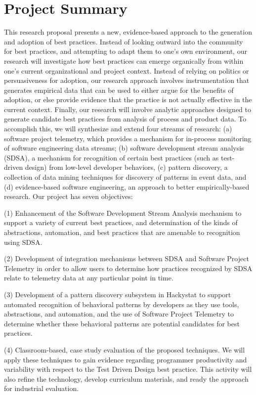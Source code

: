 \documentclass[11pt]{article}
\begin{document}
\section*{Project Summary}

This research proposal presents a new, evidence-based approach to the
generation and adoption of best practices.  Instead of looking outward into
the community for best practices, and attempting to adapt them to one's own
environment, our research will investigate how best practices can emerge
organically from within one's current organizational and project context.
Instead of relying on politics or persuasiveness for adoption, our research
approach involves instrumentation that generates empirical data that can be
used to either argue for the benefits of adoption, or else provide evidence
that the practice is not actually effective in the current context.
Finally, our research will involve analytic approaches designed to generate
candidate best practices from analysis of process and product data.  To
accomplish this, we will synthesize and extend four streams of research:
(a) software project telemetry, which provides a mechanism for in-process
monitoring of software engineering data streams; (b) software development
stream analysis (SDSA), a mechanism for recognition of certain best practices
(such as test-driven design) from low-level developer behaviors, (c) pattern
discovery, a collection of data mining techniques for discovery of patterns
in event data, and (d) evidence-based software engineering, an approach to 
better empirically-based research.  Our project has seven objectives:

  
(1) Enhancement of the Software Development Stream Analysis mechanism to
  support a variety of current best practices, and determination of the
  kinds of abstractions, automation, and best practices that are amenable
  to recognition using SDSA.

(2) Development of integration mechanisms between SDSA and Software
  Project Telemetry in order to allow users to determine how practices
  recognized by SDSA relate to telemetry data at any particular point in time.
  
(3) Development of a pattern discovery subsystem in Hackystat to support
automated recognition of behavioral patterns by developers as they use tools, 
abstractions, and automation, and the use of Software Project Telemetry to 
determine whether these behavioral patterns are potential candidates for best
practices. 
  
(4) Classroom-based, case study evaluation of the proposed techniques. We will 
apply these techniques to gain evidence regarding programmer productivity and variability 
with respect to the Test Driven Design best practice. This activity will also 
refine the technology, develop curriculum materials, and ready the approach for 
industrial evaluation. 
\end{document}
